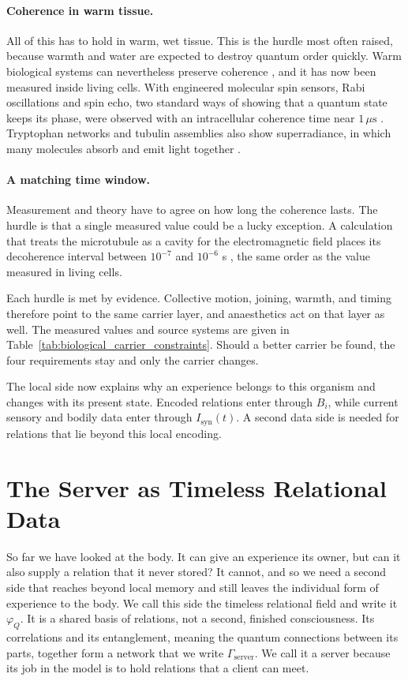 \paragraph{Coherence in warm tissue.}
All of this has to hold in warm, wet tissue. This is the hurdle most often raised,
because warmth and water are expected to destroy quantum order quickly. Warm
biological systems can nevertheless preserve coherence
\citep{engel2007,panitchayangkoon2010,collini2010}, and it has now been measured
inside living cells. With engineered molecular spin sensors, Rabi
oscillations and spin echo, two standard ways of showing that a quantum state keeps
its phase, were observed with an intracellular coherence time near
$1\,\mu\mathrm{s}$ \citep{ishiwata2026}. Tryptophan networks and tubulin assemblies
also show superradiance, in which many molecules absorb and emit light together
\citep{babcock2024}.

\paragraph{A matching time window.}
Measurement and theory have to agree on how long the coherence lasts. The hurdle is
that a single measured value could be a lucky exception. A calculation that treats
the microtubule as a cavity for the electromagnetic field places its decoherence
interval between
$10^{-7}$ and $10^{-6}$ s \citep{mavromatos2025}, the same order as the value
measured in living cells.

Each hurdle is met by evidence. Collective motion, joining, warmth, and timing
therefore point to the same carrier layer, and anaesthetics act on that layer as
well. The measured values and source systems are
given in Table~\ref{tab:biological_carrier_constraints}. Should a better carrier be
found, the four requirements stay and only the carrier changes.

The local side now explains why an experience belongs to this organism and changes
with its present state. Encoded relations enter through $B_i$, while current sensory
and bodily data enter through $I_{\mathrm{syn}}(t)$. A second data side is needed for
relations that lie beyond this local encoding.

\section{The Server as Timeless Relational Data}
\label{sec:server}

So far we have looked at the body. It can give an experience its owner, but can it
also supply a relation that it never stored? It cannot, and so we need a second side
that reaches beyond local memory and still leaves the individual form of experience to
the body. We call this side the timeless
relational field and write it $\varphi_Q$. It is a shared basis of relations, not a
second, finished consciousness. Its correlations and its entanglement, meaning the
quantum connections between its parts, together form a network that we write
$\Gamma_{\mathrm{server}}$. We call it a server because its job in the model is to
hold relations that a client can meet.

